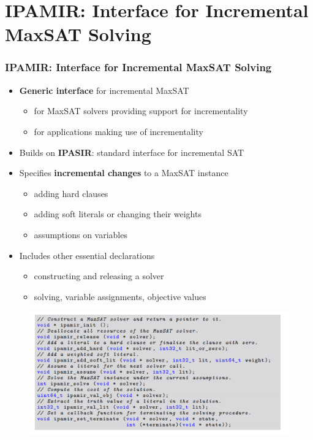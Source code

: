 \documentclass[aspectratio=169 %
,serif,mathserif]{beamer}
\begin{document}
\section{IPAMIR: Interface for Incremental MaxSAT Solving}
\begin{frame}
	\frametitle{IPAMIR: Interface for Incremental MaxSAT Solving}
	\begin{itemize}
		\item \textbf{Generic interface} for incremental MaxSAT
		\begin{itemize}
			\item for MaxSAT solvers providing support for incrementality
			\item for applications making use of incrementality
		\end{itemize} \pause
		\item Builds on \textbf{IPASIR}: standard interface for incremental SAT \pause
		\item Specifies \textbf{incremental changes} to a MaxSAT instance 
		\begin{itemize}
			\item adding hard clauses
			\item adding soft literals or changing their weights
			\item assumptions on variables
		\end{itemize} \pause		
		\item Includes other essential declarations
		\begin{itemize}
			\item constructing and releasing a solver
			\item solving, variable assignments, objective values
		\end{itemize}
	\end{itemize}
\end{frame}

\begin{frame}
	\begin{figure}[htbp]
		\includegraphics[width=0.9\linewidth]{4.png}
	\end{figure}
\end{frame}
\end{document}
